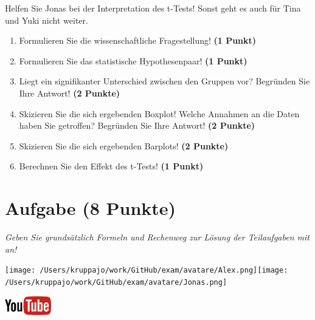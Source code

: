 \documentclass[a4paper, 9pt]{scrartcl}\usepackage[]{graphicx}\usepackage[]{xcolor}
\begin{document}
Helfen Sie Jonas bei der Interpretation des t-Tests! Sonst geht es auch für Tina und Yuki nicht weiter.
  
\begin{enumerate}
  \item Formulieren Sie die wissenschaftliche Fragestellung! \textbf{(1 Punkt)}
  \item Formulieren Sie das statistische Hypothesenpaar! \textbf{(1 Punkt)}
\item Liegt ein signifikanter Unterschied zwischen den Gruppen vor?
  Begründen Sie Ihre Antwort! \textbf{(2 Punkte)}
\item Skizieren Sie die sich ergebenden Boxplot!
  Welche Annahmen an die Daten haben Sie getroffen? Begründen Sie Ihre
  Antwort! \textbf{(2 Punkte)} 
\item Skizieren Sie die sich ergebenden Barplots! \textbf{(2 Punkte)}
\item Berechnen Sie den Effekt des t-Tests! \textbf{(1 Punkt)}
\end{enumerate}
 
\clearpage

\section{Aufgabe \hfill (8 Punkte)}

\textit{Geben Sie grundsätzlich Formeln und Rechenweg zur Lösung der Teilaufgaben mit an!} \\[1Ex]
 

 
\begin{minipage}[t]{0.5\textwidth}
\texttt{[image: /Users/kruppajo/work/GitHub/exam/avatare/Alex.png]}\hspace{-4mm}\texttt{[image: /Users/kruppajo/work/GitHub/exam/avatare/Jonas.png]}
\end{minipage}
\begin{minipage}[t]{0.5\textwidth}
\hfill
\href{https://youtu.be/kHmfEmU6lrk}{\includegraphics[width = 2cm]{img/youtube}}
\end{minipage}
\vspace{1ex}
\end{document}
